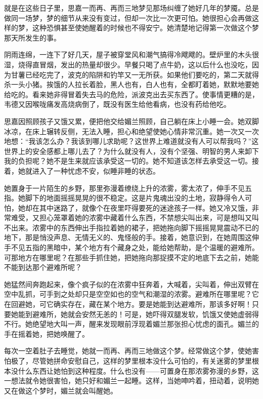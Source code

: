 \par 就是在这些日子里，思嘉一而再、再而三地梦见那场纠缠了她好几年的梦魇。总是做同一场梦，梦的细节从来没有变过，但却一次比一次更可怕。她很担心会再做这样的梦，这种恐惧甚至使她醒着的时候也不得安宁。她清楚地记得第一次做这个梦那天所发生的事。
\par 阴雨连绵，一连下了好几天，屋子被穿堂风和潮气搞得冷飕飕的。壁炉里的木头很湿，烧得直冒烟，发出的热量却很少。早餐只喝了点牛奶，这以后什么也没吃，因为甘薯已经吃完了，波克的陷阱和钓竿又一无所获。如果他们要吃的，第二天就得杀一头小猪。挨饿的人拉长着脸，黑人也有，白人也有，全都盯着她，默默地要她给吃的。看来她非得冒着失去马的危险，派波克出去买东西了。使事情更糟的是，韦德又因喉咙痛发高烧病倒了，既没有医生给他看病，也没有药给他吃。
\par 思嘉因照顾孩子又饿又累，便把他交给媚兰照顾，自己躺在床上小睡一会。她双脚冰凉，在床上辗转反侧，无法入睡，担心和绝望使她心情非常沉重。她一次又一次地想：“我该怎么办？我该到哪儿求助呢？这世界上难道就没有人可以帮我吗？”这世界上的安全感都上哪儿去了？为什么就没有人，没有个坚强、明智的男人来卸下我的负担呢？她不是生来就应该承受这一切的。她不知道该怎样去承受这一切。接着，她就进入了一种忧虑不安，似睡非睡的状态。
\par 她置身于一片陌生的乡野，那里弥漫着缭绕上升的浓雾，雾太浓了，伸手不见五指。她脚下的地面摇摇晃晃的很不稳定。这是片鬼魂出没的土地，寂静得令人可怕，她却在其中迷路了，就像个在夜里吓得要死的迷途孩子一样。她又冷又饿，非常难受，又担心笼罩着她的浓雾中藏着什么东西，不禁想尖叫出来，可是想叫又叫不出来。浓雾中的东西伸出手指拉着她的裙子，把她拖向脚下摇摇晃晃震动不已的地下，那是悄没声息、无情无义的、鬼怪般的手。接着，她意识到，在她周围这伸手不见五指的黑暗中，某个地方有个藏身之处，能给她帮助，是个温暖的避难所。可那地方在哪里呢？在那些手抓住她，把她拖向那捉摸不定的地底下去之前，她能不能到达那个避难所呢？
\par 她猛然间奔跑起来，像个疯子似的在浓雾中狂奔着，大喊着，尖叫着，伸出双臂在空中乱抓，可手到之处却只是空空如也的空气和潮湿的浓雾。避难所在哪里呢？它在回避她，可它确实存在，藏在某个地方。要是她能到达避难所，那该多好啊！只要她能到避难所，她就会安然无恙的！可是，她吓得双腿发软，饥饿又使她虚弱得不行。她绝望地大叫一声，醒来发现眼前浮现着媚兰那张担心忧虑的面孔。媚兰的手在摇着她，把她唤醒了。
\par 每次一空着肚子去睡觉，她就一而再、再而三地做这个梦。经常做这个梦，使她害怕极了，尽管她拼命安慰自己，这样的梦里根本没什么可怕的，有关迷雾的梦里根本没什么东西让她怕到这种程度。什么也没有——可置身在那浓雾弥漫的乡野，这一想法就令她很害怕，她只好和媚兰一起睡。这样，当她呻吟着，扭动着，说明她又在做这个梦时，媚兰就会叫醒她。
